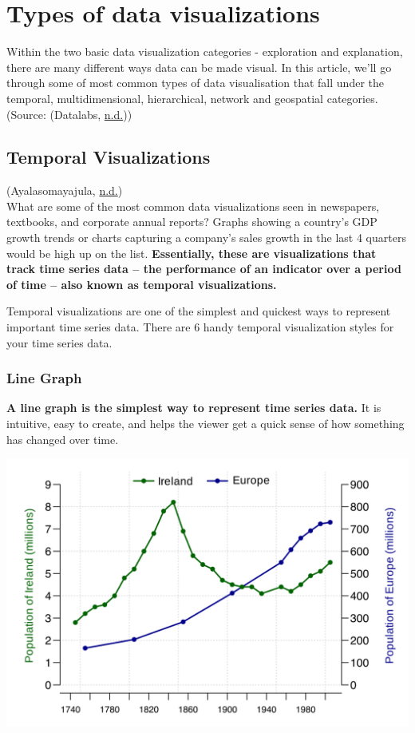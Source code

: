 \documentclass[]{book}
\begin{document}
\hypertarget{types-of-data-visualizations}{%
\section{Types of data visualizations}\label{types-of-data-visualizations}}

Within the two basic data visualization categories - exploration and explanation, there are many different ways data can be made visual. In this article, we'll go through some of most common types of data visualisation that fall under the temporal, multidimensional, hierarchical, network and geospatial categories.
(Source: (Datalabs, \protect\hyperlink{ref-chart-desp}{n.d.}))

\hypertarget{temporal-visualizations}{%
\subsection{Temporal Visualizations}\label{temporal-visualizations}}

(Ayalasomayajula, \protect\hyperlink{ref-aya-time-series}{n.d.})\\
What are some of the most common data visualizations seen in newspapers, textbooks, and corporate annual reports? Graphs showing a country's GDP growth trends or charts capturing a company's sales growth in the last 4 quarters would be high up on the list. \textbf{Essentially, these are visualizations that track time series data -- the performance of an indicator over a period of time -- also known as temporal visualizations.}

Temporal visualizations are one of the simplest and quickest ways to represent important time series data. There are 6 handy temporal visualization styles for your time series data.

\hypertarget{line-graph}{%
\subsubsection{Line Graph}\label{line-graph}}

\textbf{A line graph is the simplest way to represent time series data.} It is intuitive, easy to create, and helps the viewer get a quick sense of how something has changed over time.

\includegraphics{images/chapter5_line_graph.png}
\end{document}
